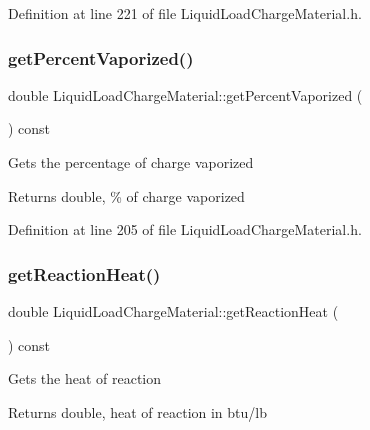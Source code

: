 Definition at line 221 of file Liquid\+Load\+Charge\+Material.\+h.

\mbox{\label{class_liquid_load_charge_material_a8e55b0df0a0551671636bcf169228dca}} 
\subsubsection{\texorpdfstring{get\+Percent\+Vaporized()}{getPercentVaporized()}}
{\footnotesize\ttfamily double Liquid\+Load\+Charge\+Material\+::get\+Percent\+Vaporized (\begin{DoxyParamCaption}{ }\end{DoxyParamCaption}) const\hspace{0.3cm}{\ttfamily [inline]}}

Gets the percentage of charge vaporized \begin{DoxyReturn}{Returns}
double, \% of charge vaporized 
\end{DoxyReturn}


Definition at line 205 of file Liquid\+Load\+Charge\+Material.\+h.

\mbox{\label{class_liquid_load_charge_material_a2f0c26e789e98efd1e8fd0c8741ddd92}} 
\subsubsection{\texorpdfstring{get\+Reaction\+Heat()}{getReactionHeat()}}
{\footnotesize\ttfamily double Liquid\+Load\+Charge\+Material\+::get\+Reaction\+Heat (\begin{DoxyParamCaption}{ }\end{DoxyParamCaption}) const\hspace{0.3cm}{\ttfamily [inline]}}

Gets the heat of reaction \begin{DoxyReturn}{Returns}
double, heat of reaction in btu/lb 
\end{DoxyReturn}


